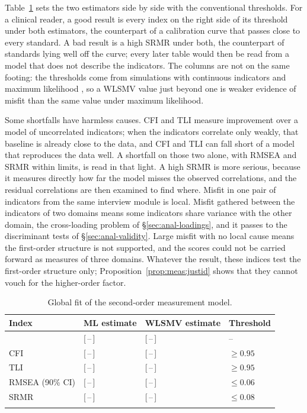 Table~\ref{tab:fit} sets the two estimators side by side with the conventional thresholds. For a clinical reader, a good result is every index on the right side of its threshold under both estimators, the counterpart of a calibration curve that passes close to every standard. A bad result is a high SRMR under both, the counterpart of standards lying well off the curve; every later table would then be read from a model that does not describe the indicators. The columns are not on the same footing: the thresholds come from simulations with continuous indicators and maximum likelihood \citep{hu_bentler_1999}, so a WLSMV value just beyond one is weaker evidence of misfit than the same value under maximum likelihood.

Some shortfalls have harmless causes. CFI and TLI measure improvement over a model of uncorrelated indicators; when the indicators correlate only weakly, that baseline is already close to the data, and CFI and TLI can fall short of a model that reproduces the data well. A shortfall on those two alone, with RMSEA and SRMR within limits, is read in that light. A high SRMR is more serious, because it measures directly how far the model misses the observed correlations, and the residual correlations are then examined to find where. Misfit in one pair of indicators from the same interview module is local. Misfit gathered between the indicators of two domains means some indicators share variance with the other domain, the cross-loading problem of \S\ref{sec:anal-loadings}, and it passes to the discriminant tests of \S\ref{sec:anal-validity}. Large misfit with no local cause means the first-order structure is not supported, and the scores could not be carried forward as measures of three domains. Whatever the result, these indices test the first-order structure only; Proposition~\ref{prop:meas:justid} shows that they cannot vouch for the higher-order factor.

\begin{table}[h]
\centering
\caption{Global fit of the second-order measurement model.}
\label{tab:fit}
\footnotesize
\renewcommand{\arraystretch}{1.2}
\begin{tabular}{p{4.5cm} p{3cm} p{3cm} p{2.2cm}}
\toprule
\textbf{Index} & \textbf{ML estimate} & \textbf{WLSMV estimate} & \textbf{Threshold} \\
\midrule
\hprows{fit}{%
$\chi^2$ (df), $p$ & [\,--\,] & [\,--\,] & -- \\
CFI & [\,--\,] & [\,--\,] & $\geq 0.95$ \\
TLI & [\,--\,] & [\,--\,] & $\geq 0.95$ \\
RMSEA (90\% CI) & [\,--\,] & [\,--\,] & $\leq 0.06$ \\
SRMR & [\,--\,] & [\,--\,] & $\leq 0.08$ \\
}
\bottomrule
\end{tabular}
\end{table}

